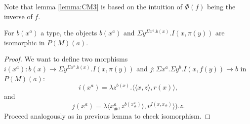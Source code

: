 \begin{remark}
  Note that lemma \ref{lemma:CM3} is based on the intuition of $\Phi(f)$ being the inverse of $f$. 
\end{remark}

\begin{lemma}\label{lemma:CM4}
For $b(x^a)$ a type, the objects $b(x^a)$ and $\Sigma y^{\Sigma x^a.b(x)}. I(x,\pi(y))$ are isomorphic in $P(M)(a)$.
\end{lemma}
\begin{proof}
  We want to define two morphisms $i(x^a):b(x) \to\Sigma y^{\Sigma x^a.b(x)}. I(x,\pi(y))$ and $j:\Sigma x^a. \Sigma y^b. I(x,f(y)) \to b$ in $P(M)(a)$:
  $$i(x^a) = \lambda z^{b(x)}. \langle\langle x, z\rangle, r(x) \rangle,$$
  and
  $$j(x^a) = \lambda \langle x_\#^a, z^{b(x_\#^a)} \rangle, v^{I(x,x_\#)}\rangle). z .$$
Proceed analogously as in previous lemma to check isomorphism. 
\end{proof}



